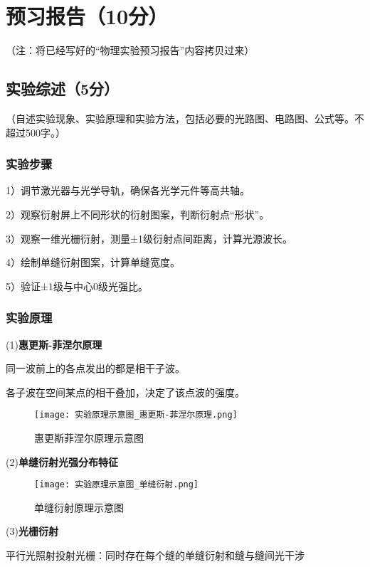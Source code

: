\documentclass[]{../模板/Report}%
\begin{document}
\maketitle%

\section{预习报告（10分）}
（注：将已经写好的“物理实验预习报告”内容拷贝过来）

\subsection{实验综述（5分）}
（自述实验现象、实验原理和实验方法，包括必要的光路图、电路图、公式等。不超过500字。）
\subsubsection{实验步骤}
1）调节激光器与光学导轨，确保各光学元件等高共轴。
\par
2）观察衍射屏上不同形状的衍射图案，判断衍射点“形状”。
\par
3）观察一维光栅衍射，测量±1级衍射点间距离，计算光源波长。
\par
4）绘制单缝衍射图案，计算单缝宽度。
\par
5）验证±1级与中心0级光强比。


\subsubsection{实验原理}
(1)\textbf{惠更斯-菲涅尔原理}
\par
同一波前上的各点发出的都是相干子波。
\par
各子波在空间某点的相干叠加，决定了该点波的强度。
\begin{figure}[H]
    \centering
    \texttt{[image: 实验原理示意图\_惠更斯-菲涅尔原理.png]}
    \caption{惠更斯菲涅尔原理示意图}
\end{figure}
\par

(2)\textbf{单缝衍射光强分布特征}
\par
\begin{figure}[H]
    \centering
    \texttt{[image: 实验原理示意图\_单缝衍射.png]}
    \caption{单缝衍射原理示意图}
\end{figure}

(3)\textbf{光栅衍射}
\par
平行光照射投射光栅：同时存在每个缝的单缝衍射和缝与缝间光干涉
\end{document}
